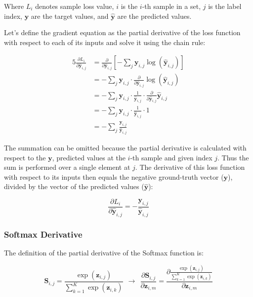 \documentclass[a4paper]{article}
\newcommand{\matr}[1]{\mathbf{#1}}
\newcommand{\vect}[1]{\bm{#1}}
\begin{document}
Where $L_i$ denotes sample loss value, $i$ is the $i$-th sample in a set, $j$ is the label index, $\vect{y}$ are the target values, and $\vect{\hat{y}}$ are the predicted values.

Let's define the gradient equation as the partial derivative of the loss function with respect to each of its inputs and solve it using the chain rule:

\begin{alignat*}{5}
    \frac{\partial L_i}{\partial \vect{\hat{y}}_{i,j}} &= \frac{\partial}{\partial \vect{\hat{y}}_{i,j}} [-\sum_j \vect{y}_{i,j} \log(\vect{\hat{y}}_{i,j})] \\
    &= -\sum_j \vect{y}_{i,j} \cdot \frac{\partial}{\partial \vect{\hat{y}}_{i,j}} \log(\vect{\hat{y}}_{i,j}) \\
    &= -\sum_j \vect{y}_{i,j} \cdot \frac{1}{\vect{\hat{y}}_{i,j}} \cdot \frac{\partial}{\partial \vect{\hat{y}}_{i,j}} \vect{\hat{y}}_{i,j} \\
    &= -\sum_j \vect{y}_{i,j} \cdot \frac{1}{\vect{\hat{y}}_{i,j}} \cdot 1 \\
    &= -\sum_j \frac{\vect{y}_{i,j}}{\vect{\hat{y}}_{i,j}}
\end{alignat*}

The summation can be omitted because the partial derivative is calculated with respect to the $\vect{y}$, predicted values at the $i$-th sample and given index $j$. Thus the sum is performed over a single element at $j$. The derivative of this loss function with respect to its inputs then equals the negative ground-truth vector ($\vect{y}$), divided by the vector of the predicted values ($\vect{\hat{y}}$):

\begin{equation*}
    \frac{\partial L_i}{\partial \vect{\hat{y}}_{i,j}} = -\frac{\vect{y}_{i,j}}{\vect{\hat{y}}_{i,j}}
\end{equation*}

\pagebreak
\subsubsection*{Softmax Derivative}
The definition of the partial derivative of the Softmax function is:

\begin{equation*}
    \matr{S}_{i,j} = \frac{\exp(\vect{z}_{i,j})}{\sum_{k=1}^K \exp(\vect{z}_{i,k})} ~~ \rightarrow ~~ \frac{\partial \matr{S}_{i,j}}{\partial \vect{z}_{i,m}} = \frac{\partial \frac{\exp(\vect{z}_{i,j})}{\sum_{k=1}^{K} \exp(\vect{z}_{i,k})}}{\partial \vect{z}_{i,m}}
\end{equation*}
\end{document}
